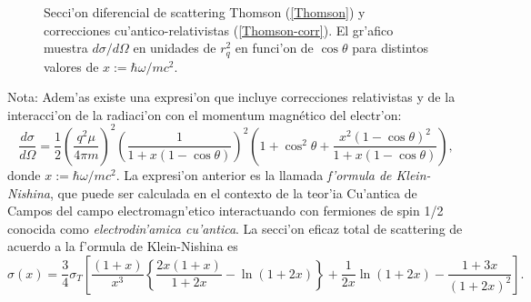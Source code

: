 \begin{figure}[!h]
\centerline{}
 \caption{Secci'on diferencial de scattering Thomson (\ref{Thomson}) y
correcciones cu'antico-relativistas (\ref{Thomson-corr}). El gr'afico muestra
${d\sigma}/{d\Omega}$ en unidades de $r_q^2$ en funci'on de
$\cos\theta$ para distintos valores de $x:={\hbar\omega}/{mc^2}$.}
\label{thomson}
\end{figure}

Nota: Adem'as existe una expresi'on que incluye correcciones relativistas y de la interacci'on de la radiaci'on con el momentum magn\'{e}tico del electr'on:
\begin{equation}
\frac{d\sigma }{d\Omega}=\frac{1}{2}\left(\frac{q^2\mu}{4\pi m}\right)^2
\left(  \frac{1}{1+x\left(  1-\cos
\theta\right)  }\right)  ^{2}\left(  1+\cos^{2}\theta+\frac{x^{2}\left(
1-\cos\theta\right)  ^{2}}{1+x\left(  1-\cos\theta\right)  }\right),
\end{equation}
donde $x:={\hbar\omega}/{mc^{2}}$. La expresi'on anterior es la llamada \textit{f'ormula de Klein-Nishina}, que puede ser calculada en el contexto de la teor'ia Cu'antica de Campos del campo electromagn'etico interactuando con fermiones de spin 1/2 conocida como \textit{electrodin'amica cu'antica}.
La secci'on eficaz total de scattering de acuerdo a la f'ormula de Klein-Nishina es
\begin{equation}
 \sigma(x)=\frac{3}{4}\sigma_T\left[\frac{(1+x)}{x^3}\left\lbrace\frac{2x(1+x)}{1+2x}-\ln(1+2x)\right\rbrace+\frac{1}{2x}\ln(1+2x)-\frac{1+3x}{(1+2x)^2}\right].
\end{equation}



%
%



